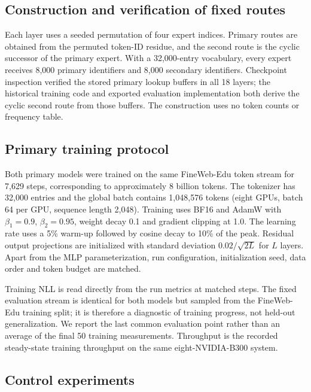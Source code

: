 \documentclass[11pt]{article}
\begin{document}
\subsection*{Construction and verification of fixed routes}

Each layer uses a seeded permutation of four expert indices. Primary routes are obtained from the permuted token-ID residue, and the second route is the cyclic successor of the primary expert. With a 32,000-entry vocabulary, every expert receives 8,000 primary identifiers and 8,000 secondary identifiers. Checkpoint inspection verified the stored primary lookup buffers in all 18 layers; the historical training code and exported evaluation implementation both derive the cyclic second route from those buffers. The construction uses no token counts or frequency table.

\subsection*{Primary training protocol}

Both primary models were trained on the same FineWeb-Edu token stream for 7,629 steps, corresponding to approximately 8 billion tokens. The tokenizer has 32,000 entries and the global batch contains 1,048,576 tokens (eight GPUs, batch 64 per GPU, sequence length 2,048). Training uses BF16 and AdamW with $\beta_1=0.9$, $\beta_2=0.95$, weight decay 0.1 and gradient clipping at 1.0. The learning rate uses a 5\% warm-up followed by cosine decay to 10\% of the peak. Residual output projections are initialized with standard deviation $0.02/\sqrt{2L}$ for $L$ layers\cite{radford2019language}. Apart from the MLP parameterization, run configuration, initialization seed, data order and token budget are matched.

Training NLL is read directly from the run metrics at matched steps. The fixed evaluation stream is identical for both models but sampled from the FineWeb-Edu training split; it is therefore a diagnostic of training progress, not held-out generalization. We report the last common evaluation point rather than an average of the final 50 training measurements. Throughput is the recorded steady-state training throughput on the same eight-NVIDIA-B300 system.

\subsection*{Control experiments}
\end{document}
